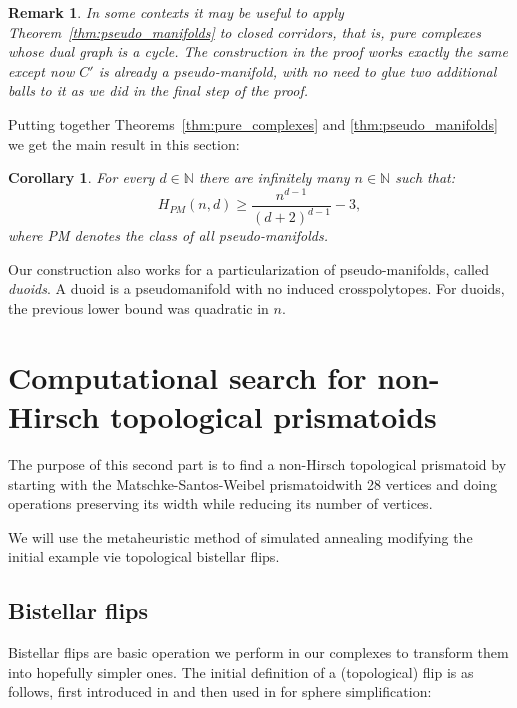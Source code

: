 \documentclass[12pt,a4paper]{article}
\newcommand{\N}{\mathbb N}
\theoremstyle{plain}
\newtheorem{corollary}{Corollary}
\newtheorem*{remark}{Remark}
\theoremstyle{definition}
\begin{document}
\begin{remark}
\label{rem:closed-corridor}
In some contexts it may be useful to apply Theorem~\ref{thm:pseudo_manifolds} to \emph{closed corridors}, that is, pure complexes whose dual graph is a cycle. The construction in the proof works exactly the same except now $C'$ is already a pseudo-manifold, with no need to glue two additional balls to it as we did in the final step of the proof.
\end{remark}

Putting together Theorems~\ref{thm:pure_complexes} and \ref{thm:pseudo_manifolds} we get the main result in this section:

\begin{corollary}
\label{coro:pseudo_manifolds}
For every $d\in \N$ there are infinitely many $n\in\N$ such that:
\[
  H_{PM}(n,d) \ge \frac{n^{d-1}}{(d+2)^{d-1}}-3,
\]
where PM denotes the class of all pseudo-manifolds.
\end{corollary}

Our construction also works for a particularization of pseudo-manifolds, called \emph{duoids}\cite{Todd:duoids}. A duoid is a pseudomanifold with no induced crosspolytopes. For duoids, the previous lower bound was quadratic in $n$.

\section{ Computational search for non-Hirsch topological prismatoids}
\label{sec:prismatoids}
The purpose of this second part is to find a non-Hirsch topological prismatoid by starting with the Matschke-Santos-Weibel prismatoidwith 28 vertices and doing operations preserving its width while reducing its number of vertices.

We will use the metaheuristic method of simulated annealing modifying the initial example vie topological bistellar flips.

\subsection{Bistellar flips}
Bistellar flips are basic operation we perform in our complexes to transform them into hopefully simpler ones. The initial definition of a (topological) flip is as follows, first introduced in  \cite{Pachner} and then used in \cite{Lutz} for sphere simplification:
\end{document}
